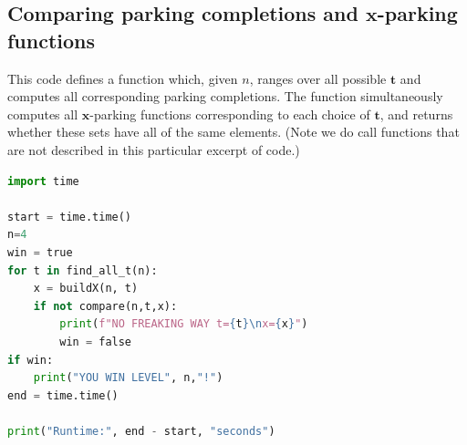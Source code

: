 \documentclass{amsart}
\theoremstyle{definition}
\numberwithin{equation}{section}
\begin{document}
\subsection{Comparing parking completions and $\mathbf{x}$-parking functions}\label{sec:appendix_code_check_all_xpf_short_paper}
This code defines a function which, given $n$, ranges over all possible $\mathbf{t}$ and computes all corresponding parking completions.
The function simultaneously computes all $\mathbf{x}$-parking functions corresponding to each choice of $\mathbf{t}$, and returns whether these sets have all of the same elements.
(Note we do call functions that are not described in this particular excerpt of code.)

\begin{lstlisting}[language=Python]
import time

start = time.time()
n=4
win = true
for t in find_all_t(n):
    x = buildX(n, t)
    if not compare(n,t,x):
        print(f"NO FREAKING WAY t={t}\nx={x}")
        win = false
if win:
    print("YOU WIN LEVEL", n,"!")
end = time.time()

print("Runtime:", end - start, "seconds")
\end{lstlisting}
\end{document}
